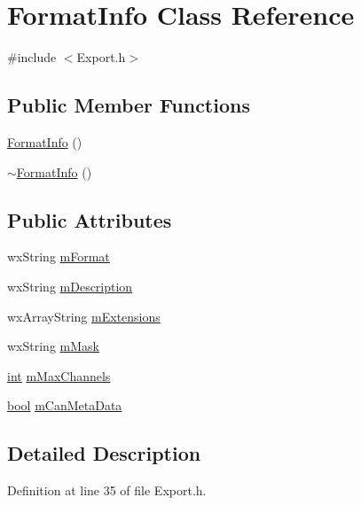 \hypertarget{class_format_info}{}\section{Format\+Info Class Reference}
\label{class_format_info}


{\ttfamily \#include $<$Export.\+h$>$}

\subsection*{Public Member Functions}
\begin{DoxyCompactItemize}
\item 
\hyperlink{class_format_info_ad1ca05c8df93a107184e052c7954dbbf}{Format\+Info} ()
\item 
\hyperlink{class_format_info_a7a699ce18fb4a954d4995803bc6678d9}{$\sim$\+Format\+Info} ()
\end{DoxyCompactItemize}
\subsection*{Public Attributes}
\begin{DoxyCompactItemize}
\item 
wx\+String \hyperlink{class_format_info_a754a47fefe3eb4028cf4bbd714c3bb63}{m\+Format}
\item 
wx\+String \hyperlink{class_format_info_a3b3843587ba5477383c398f37d8b5eea}{m\+Description}
\item 
wx\+Array\+String \hyperlink{class_format_info_aa984a8201ea2a7669047077c08f83858}{m\+Extensions}
\item 
wx\+String \hyperlink{class_format_info_a46b77bef0ac5b8356bf098d9ddfc89cc}{m\+Mask}
\item 
\hyperlink{xmltok_8h_a5a0d4a5641ce434f1d23533f2b2e6653}{int} \hyperlink{class_format_info_a007c961ea4b94091988f0472ada973e6}{m\+Max\+Channels}
\item 
\hyperlink{mac_2config_2i386_2lib-src_2libsoxr_2soxr-config_8h_abb452686968e48b67397da5f97445f5b}{bool} \hyperlink{class_format_info_a5be67ad9eee9d112c6fd5cb1c25dd84b}{m\+Can\+Meta\+Data}
\end{DoxyCompactItemize}


\subsection{Detailed Description}


Definition at line 35 of file Export.\+h.



